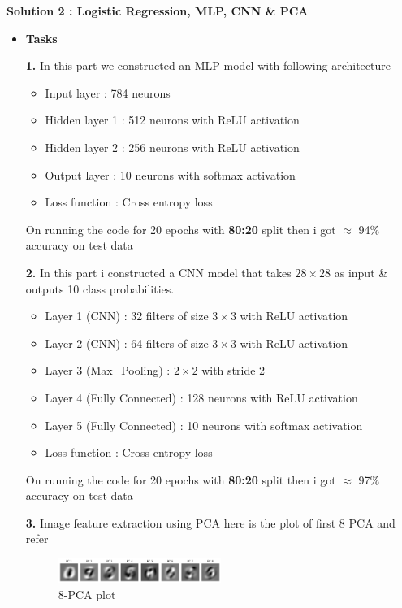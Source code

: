 \documentclass{article}
\begin{document}
\noindent    \textbf{Solution 2 : Logistic Regression, MLP, CNN \& PCA}
\begin{itemize}
    \item \textbf{Tasks}
    
    \textbf{1.} In this part we constructed an MLP model with following architecture
    \begin{itemize}
        \item Input layer : 784 neurons
        \item Hidden layer 1 : 512 neurons with ReLU activation
        \item Hidden layer 2 : 256 neurons with ReLU activation
        \item Output layer : 10 neurons with softmax activation
        \item Loss function : Cross entropy loss
    \end{itemize}
    On running the code for 20 epochs with \textbf{80:20} split then i got $\approx$ 94\% accuracy on test data

\hspace{15pt}

    \textbf{2.} In this part i constructed a CNN model that takes $28 \times 28$ as input \& outputs 10 class probabilities.
    \begin{itemize}
    \item Layer 1 (CNN) : 32 filters of size $3 \times 3$ with ReLU activation
    \item Layer 2 (CNN) : 64 filters of size $3 \times 3$ with ReLU activation
    \item Layer 3 (Max\_Pooling) : $2 \times 2$ with stride 2
    \item Layer 4 (Fully Connected) : 128 neurons with ReLU activation
    \item Layer 5 (Fully Connected) : 10 neurons with softmax activation
    \item Loss function : Cross entropy loss
\end{itemize}

On running the code for 20 epochs with \textbf{80:20} split then i got $\approx$ 97\% accuracy on test data

\newpage 
\textbf{3.} Image feature extraction using PCA here is  the plot of first 8 PCA and refer 

\begin{figure}[h]
    \centering
    \includegraphics[width=0.5\textwidth]{pca.png}
    \caption{8-PCA plot}
\end{figure}


\end{itemize}
\end{document}

